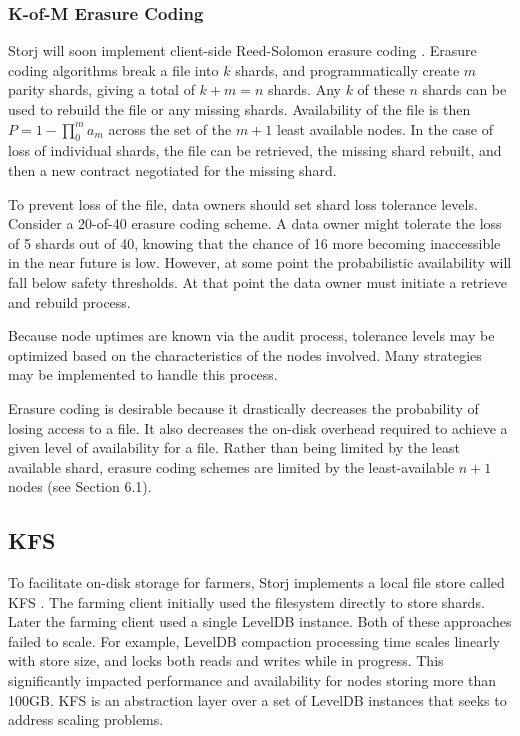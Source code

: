 \documentclass[a4paper,10pt]{article}
\begin{document}
\subsubsection{K-of-M Erasure Coding}
Storj will soon implement client-side Reed-Solomon erasure coding \cite{27}.
Erasure coding algorithms break a file into $ k $ shards, and programmatically
create $ m $ parity shards, giving a total of $ k + m = n $ shards. Any $ k $ of
these $ n $ shards can be used to rebuild the file or any missing shards.
Availability of the file is then $ P = 1 - \prod_{0}^{m} a_{m} $ across the set
of the $m + 1$ least available nodes. In the case of loss of individual shards,
the file can be retrieved, the missing shard rebuilt, and then a new contract
negotiated for the missing shard.

To prevent loss of the file, data owners should set shard loss tolerance levels.
Consider a 20-of-40 erasure coding scheme. A data owner might tolerate the loss
of 5 shards out of 40, knowing that the chance of 16 more becoming inaccessible
in the near future is low. However, at some point the probabilistic availability
will fall below safety thresholds. At that point the data owner must initiate a
retrieve and rebuild process.

Because node uptimes are known via the audit process, tolerance levels may be
optimized based on the characteristics of the nodes involved. Many strategies
may be implemented to handle this process.

Erasure coding is desirable because it drastically decreases the probability of
losing access to a file. It also decreases the on-disk overhead required to
achieve a given level of availability for a file. Rather than being limited by
the least available shard, erasure coding schemes are limited by the
least-available $ n + 1 $ nodes (see Section 6.1).

\subsection{KFS}
To facilitate on-disk storage for farmers, Storj implements a local file store
called KFS \cite{12}. The farming client initially used the filesystem directly
to store shards. Later the farming client used a single LevelDB instance. Both
of these approaches failed to scale. For example, LevelDB compaction processing
time scales linearly with store size, and locks both reads and writes while in
progress. This significantly impacted performance and availability for nodes
storing more than 100GB. KFS is an abstraction layer over a set of LevelDB
instances that seeks to address scaling problems.
\end{document}
